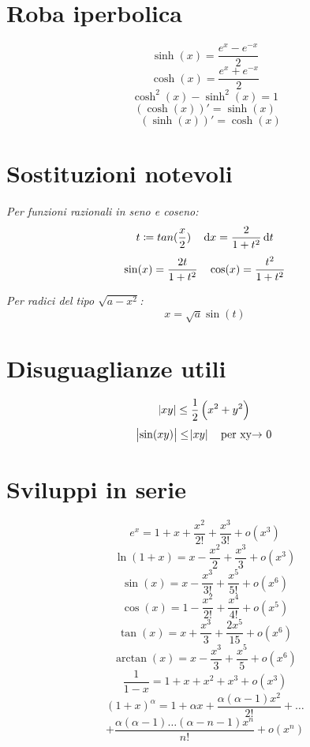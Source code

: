 \documentclass[a4paper,portrait,columns=3,5pt]{cheatsheet}
\begin{document}
\section{Roba iperbolica}
$$ \sinh(x) = \frac{e^x - e^{-x}}{2} $$
$$\cosh(x) = \frac{e^x + e^{-x}}{2}$$
$$ \cosh^2(x) - \sinh^2(x) = 1 $$
$$ (\cosh(x))' = \sinh(x)$$
$$ \quad (\sinh(x))' = \cosh(x) $$
\section{Sostituzioni notevoli}
\textit{Per funzioni razionali in seno e coseno:} 
$$t \coloneqq tan(\frac{x}{2})\quad \dif x = \frac{2}{1 + t^2} \dif t$$
$$ \sin(x) = \frac{2t}{1+t^2} \quad \cos(x) = \frac{\-t^2}{1+t^2}$$

\textit{Per radici del tipo $\sqrt{a - x^2}$:}
$$ x = \sqrt{a} \sin(t) $$
\section{Disuguaglianze utili}
$$ \abs{xy} \leq \frac{1}{2}\left(x^2 + y^2\right) $$
$$ \abs{\sin(xy)} \leq \abs{xy}\quad \text{per xy$\rightarrow$ 0}$$
\section{Sviluppi in serie}
$$ e^x = 1 + x + \frac{x^2}{2!} + \frac{x^3}{3!} + o(x^3)$$
$$ \ln(1 + x) = x - \frac{x^2}{2} + \frac{x^3}{3} + o(x^3)$$
$$ \sin(x) = x - \frac{x^3}{3!} + \frac{x^5}{5!} + o(x^6)$$
$$ \cos(x) = 1 - \frac{x^2}{2!} + \frac{x^4}{4!} + o(x^5)$$
$$ \tan(x) = x + \frac{x^3}{3} + \frac{2x^5}{15} + o(x^6)$$
$$ \arctan(x) = x - \frac{x^3}{3} + \frac{x^5}{5} + o(x^6)$$
$$ \frac{1}{1-x} = 1 + x + x^2 + x^3 + o(x^3)$$
$$(1 + x) ^ \alpha = 1 + \alpha x + \frac{\alpha (\alpha - 1)x^2}{2!} + \dots $$
$$ + \frac{\alpha(\alpha - 1)\dots (\alpha - n - 1) x^n}{n!} + o(x^n) $$
\end{document}
